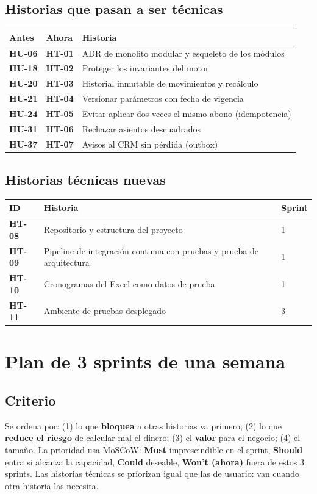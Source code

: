 \documentclass[11pt,a4paper]{article}
\newcommand{\must}{\colorbox{alerta}{\color{white}\textbf{\small Must}}}
\newcommand{\should}{\colorbox{primario}{\color{white}\textbf{\small Should}}}
\newcommand{\could}{\colorbox{gris}{\color{white}\textbf{\small Could}}}
\newcommand{\wont}{\colorbox{gray!40}{\textbf{\small Won't (ahora)}}}
\begin{document}
\subsection*{Historias que pasan a ser técnicas}
\begin{tabularx}{\linewidth}{>{\bfseries}l >{\bfseries}l X}
\toprule
Antes & Ahora & Historia \\
\midrule
HU-06 & HT-01 & ADR de monolito modular y esqueleto de los módulos \\
HU-18 & HT-02 & Proteger los invariantes del motor \\
HU-20 & HT-03 & Historial inmutable de movimientos y recálculo \\
HU-21 & HT-04 & Versionar parámetros con fecha de vigencia \\
HU-24 & HT-05 & Evitar aplicar dos veces el mismo abono (idempotencia) \\
HU-31 & HT-06 & Rechazar asientos descuadrados \\
HU-37 & HT-07 & Avisos al CRM sin pérdida (outbox) \\
\bottomrule
\end{tabularx}

\subsection*{Historias técnicas nuevas}
\begin{tabularx}{\linewidth}{>{\bfseries}l X l}
\toprule
ID & Historia & Sprint \\
\midrule
HT-08 & Repositorio y estructura del proyecto & 1 \\
HT-09 & Pipeline de integración continua con pruebas y prueba de arquitectura & 1 \\
HT-10 & Cronogramas del Excel como datos de prueba & 1 \\
HT-11 & Ambiente de pruebas desplegado & 3 \\
\bottomrule
\end{tabularx}

\section{Plan de 3 sprints de una semana}

\subsection*{Criterio}
Se ordena por: (1) lo que \textbf{bloquea} a otras historias va primero; (2) lo que
\textbf{reduce el riesgo} de calcular mal el dinero; (3) el \textbf{valor} para el negocio;
(4) el tamaño. La prioridad usa MoSCoW: \must{} imprescindible en el sprint,
\should{} entra si alcanza la capacidad, \could{} deseable, \wont{} fuera de estos 3 sprints.
Las historias técnicas se priorizan igual que las de usuario: van cuando otra historia las necesita.
\end{document}
